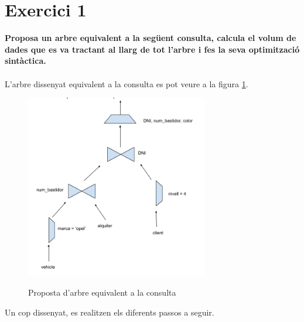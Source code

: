 \documentclass[12pt]{article}
\begin{document}
\section{Exercici 1}
\textbf{Proposa un arbre equivalent a la següent consulta, calcula el volum de dades que es va tractant al llarg de tot l’arbre i fes la seva optimització sintàctica.}\\\\
L'arbre dissenyat equivalent a la consulta es pot veure a la figura \ref{fig:cons1}.
\begin{figure}[H]
	\centering
	\includegraphics[width=8cm]{imgs/img1.png}
	\label{fig:cons1}
	\caption{Proposta d'arbre equivalent a la consulta}
\end{figure}
Un cop dissenyat, es realitzen els diferents passos a seguir.
\end{document}
